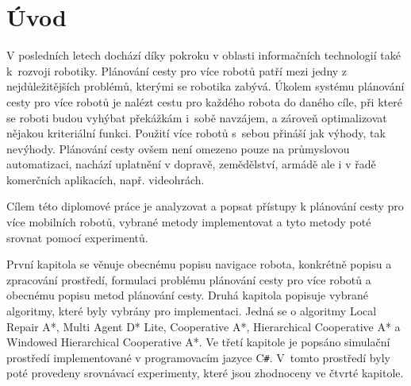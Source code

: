 \cleardoublepage
\chapter*{Úvod}


V posledních letech dochází díky pokroku v oblasti informačních technologií také k~rozvoji robotiky. Plánování cesty pro více robotů patří mezi jedny z nejdůležitějších problémů, kterými se robotika zabývá. Úkolem systému plánování cesty pro více robotů je nalézt cestu pro každého robota do daného cíle, při které se roboti budou vyhýbat překážkám i~sobě navzájem, a zároveň optimalizovat nějakou kriteriální funkci. Použití více robotů s~sebou přináší jak výhody, tak nevýhody. Plánování cesty
ovšem není omezeno pouze na průmyslovou automatizaci, nachází uplatnění v dopravě, zemědělství, armádě ale i v řadě komerčních aplikacích, např. videohrách.

Cílem této diplomové práce je analyzovat a popsat přístupy k plánování cesty pro více mobilních robotů, vybrané metody implementovat a tyto metody poté srovnat pomocí experimentů.

První kapitola se věnuje obecnému popisu navigace robota, konkrétně popisu a zpracování prostředí, formulaci problému plánování cesty pro více robotů a obecnému popisu metod plánování cesty. Druhá kapitola popisuje vybrané algoritmy, které byly vybrány pro implementaci. Jedná se o algoritmy Local Repair A*, Multi Agent D* Lite, Cooperative A*, Hierarchical Cooperative A* a Windowed Hierarchical Cooperative A*. Ve třetí kapitole je popsáno simulační prostředí implementované v programovacím jazyce C\texttt{\#}. V~tomto prostředí byly poté provedeny srovnávací experimenty, které jsou zhodnoceny ve čtvrté kapitole.